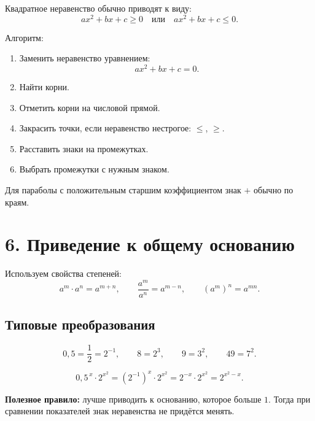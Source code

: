 \documentclass[a4paper,12pt]{article}
\newcommand{\sectionline}{\vspace{2mm}{\color{accent}\hrule height 0.6pt}\vspace{2mm}}
\newcommand{\important}[1]{\textcolor{darkaccent}{\textbf{#1}}}
\begin{document}
Квадратное неравенство обычно приводят к виду:
\[
ax^2+bx+c \ge 0
\quad \text{или} \quad
ax^2+bx+c \le 0.
\]

Алгоритм:
\begin{enumerate}
    \item Заменить неравенство уравнением:
    \[
    ax^2+bx+c=0.
    \]
    \item Найти корни.
    \item Отметить корни на числовой прямой.
    \item Закрасить точки, если неравенство нестрогое: \(\le\), \(\ge\).
    \item Расставить знаки на промежутках.
    \item Выбрать промежутки с нужным знаком.
\end{enumerate}

\begin{center}

\small Для параболы с положительным старшим коэффициентом знак \(+\) обычно по краям.
\end{center}

\section*{6. Приведение к общему основанию}
\sectionline

Используем свойства степеней:
\[
a^m\cdot a^n=a^{m+n},\qquad
\frac{a^m}{a^n}=a^{m-n},\qquad
(a^m)^n=a^{mn}.
\]

\subsection*{Типовые преобразования}

\[
0{,}5=\frac12=2^{-1},\qquad
8=2^3,\qquad
9=3^2,\qquad
49=7^2.
\]

\[
0{,}5^{\,x}\cdot 2^{x^2}
=
(2^{-1})^x\cdot 2^{x^2}
=
2^{-x}\cdot 2^{x^2}
=
2^{x^2-x}.
\]

\important{Полезное правило:} лучше приводить к основанию, которое больше \(1\). Тогда при сравнении показателей знак неравенства не придётся менять.
\end{document}
